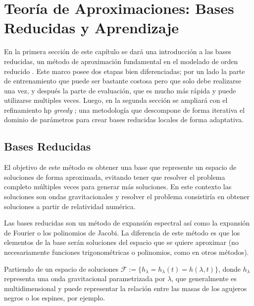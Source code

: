 \chapter{Teoría de Aproximaciones: Bases Reducidas y Aprendizaje}


En la primera sección de este capítulo se dará una introducción a las bases reducidas, un método de aproximación fundamental en el modelado de orden reducido \cite{Tiglio:2021ysj}. Este marco posee dos etapas bien diferenciadas; por un lado la parte de entrenamiento que puede ser bastante costosa pero que solo debe realizarse una vez, y después la parte de evaluación, que es mucho más rápida y puede utilizarse multiples veces.
Luego, en la segunda sección se ampliará con el refinamiento hp \textit{greedy} \cite{Cerino:2022dhr}; una metodología que descompone de forma iterativa el dominio de parámetros para crear bases reducidas locales de forma adaptativa.


\section{Bases Reducidas}

El objetivo de este método es obtener una base que represente un espacio de soluciones de forma aproximada, evitando tener que resolver el problema completo múltiples veces para generar más soluciones. 
En este contexto las soluciones son ondas gravitacionales y resolver el problema consistiría en obtener soluciones a partir de relatividad numérica.

Las bases reducidas son un método de expansión espectral así como la expansión de Fourier o los polinomios de Jacobi. La diferencia de este método es que los elementos de la base serán soluciones del espacio que se quiere aproximar (no necesariamente funciones trigonométricas o polinomios, como en otros métodos).

Partiendo de un espacio de soluciones $\mathcal{F}:= \{ h_{\lambda} = h_{\lambda}(t) = h(\lambda, t)\}$, donde $h_{\lambda}$ representa una onda gravitacional parametrizada por $\lambda$, que generalmente es multidimensional y puede representar la relación entre las masas de los agujeros negros o los espines, por ejemplo.

